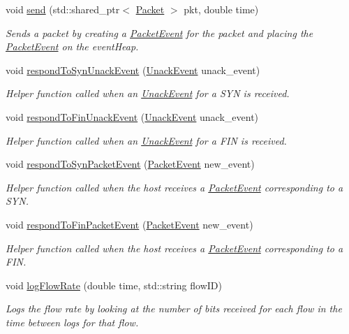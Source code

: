 \begin{DoxyCompactItemize}
void \hyperlink{classHost_a7aeac15cbcd5d64ff8c2af090d8db0c4}{send} (std\-::shared\-\_\-ptr$<$ \hyperlink{classPacket}{\-Packet} $>$ pkt, double time)
\begin{DoxyCompactList}\small\item\em \-Sends a packet by creating a \hyperlink{classPacketEvent}{\-Packet\-Event} for the packet and placing the \hyperlink{classPacketEvent}{\-Packet\-Event} on the event\-Heap. \end{DoxyCompactList}\item 
void \hyperlink{classHost_a13a11214f204347c85388b28043459c2}{respond\-To\-Syn\-Unack\-Event} (\hyperlink{classUnackEvent}{\-Unack\-Event} unack\-\_\-event)
\begin{DoxyCompactList}\small\item\em \-Helper function called when an \hyperlink{classUnackEvent}{\-Unack\-Event} for a \-S\-Y\-N is received. \end{DoxyCompactList}\item 
void \hyperlink{classHost_a9f76466a0f9e8362f70c7990eae22641}{respond\-To\-Fin\-Unack\-Event} (\hyperlink{classUnackEvent}{\-Unack\-Event} unack\-\_\-event)
\begin{DoxyCompactList}\small\item\em \-Helper function called when an \hyperlink{classUnackEvent}{\-Unack\-Event} for a \-F\-I\-N is received. \end{DoxyCompactList}\item 
void \hyperlink{classHost_a55abc101a34bd2bc1aff724883a85ecc}{respond\-To\-Syn\-Packet\-Event} (\hyperlink{classPacketEvent}{\-Packet\-Event} new\-\_\-event)
\begin{DoxyCompactList}\small\item\em \-Helper function called when the host receives a \hyperlink{classPacketEvent}{\-Packet\-Event} corresponding to a \-S\-Y\-N. \end{DoxyCompactList}\item 
void \hyperlink{classHost_a6f3523a2e00b6aae6f5e9fa14b0f0e0f}{respond\-To\-Fin\-Packet\-Event} (\hyperlink{classPacketEvent}{\-Packet\-Event} new\-\_\-event)
\begin{DoxyCompactList}\small\item\em \-Helper function called when the host receives a \hyperlink{classPacketEvent}{\-Packet\-Event} corresponding to a \-F\-I\-N. \end{DoxyCompactList}\item 
void \hyperlink{classHost_ad35c542cd4f9259b0f5329eb104b5334}{log\-Flow\-Rate} (double time, std\-::string flow\-I\-D)
\begin{DoxyCompactList}\small\item\em \-Logs the flow rate by looking at the number of bits received for each flow in the time between logs for that flow. \end{DoxyCompactList}\end{DoxyCompactItemize}
